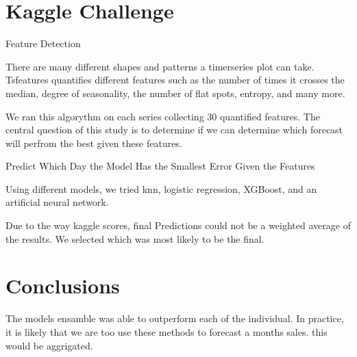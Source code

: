 \documentclass[16pt,twocolumn,letterpaper]{article}
\begin{document}
\section{Kaggle Challenge}

Feature Detection

There are many different shapes and patterns a timerseries plot can take. Tsfeatures \cite{montero2020fforma} quantifies different features such as the number of times it crosses the median, degree of seasonality, the number of flat spots, entropy, and many more. 

We ran this algorythm on each series collecting 30 quantified features. The central question of this study is to determine if we can determine which forecast will perfrom the best given these features. 

Predict Which Day the Model Has the Smallest Error Given the Features

Using different models, we tried knn, logistic regression, XGBoost, and an artificial neural network. 

Due to the way kaggle scores, final Predictions could not be a weighted average of the results. We selected which was most likely to be the final.


\section{Conclusions}

The models ensamble was able to outperform each of the individual. In practice, it is likely that we are too use these methods to forecast a months sales. this would be aggrigated.

\clearpage
\onecolumn


\end{document}
